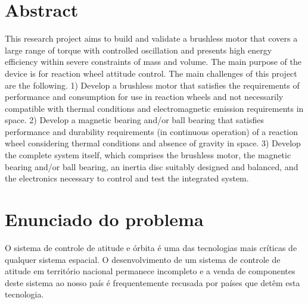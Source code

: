 \section*{Abstract}

This research project aims to build and validate a brushless motor that covers a large range of torque with controlled oscillation and presents high energy efficiency within severe constraints of mass and volume. The main purpose of the device is for reaction wheel attitude control. The main challenges of this project are the following. 1) Develop a brushless motor that satisfies the requirements of performance and consumption for use in reaction wheels and not necessarily compatible with thermal conditions and electromagnetic emission requirements in space. 2) Develop a magnetic bearing and/or ball bearing that satisfies performance and durability requirements (in continuous operation) of a reaction wheel considering thermal conditions and absence of gravity in space. 3) Develop the complete system itself, which comprises the brushless motor, the magnetic bearing and/or ball bearing, an inertia disc suitably designed and balanced, and the electronics necessary to control and test the integrated system.

\newpage

%
 \pagestyle{empty}
\maketitle
\thispagestyle{empty}
\tableofcontents  
\clearpage
{} \pagestyle{myheadings}

\section{Enunciado do problema}

O sistema de controle de atitude e órbita é uma das tecnologias mais críticas de qualquer sistema espacial. O desenvolvimento de um sistema de controle de atitude em território nacional permanece incompleto \cite{dos2010estrategia} e a venda de componentes deste sistema ao nosso país é frequentemente recusada por países que detêm esta tecnologia.

